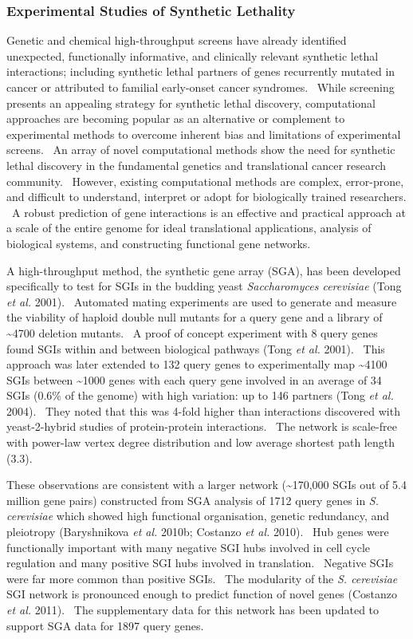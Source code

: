 \subsubsection[Experimental Studies of Synthetic Lethality]{Experimental Studies of Synthetic Lethality}
Genetic and chemical high-throughput screens have already identified unexpected, functionally informative, and clinically relevant synthetic lethal interactions; including synthetic lethal partners of genes recurrently mutated in cancer or attributed to familial early-onset cancer syndromes. \ While screening presents an appealing strategy for synthetic lethal discovery, computational approaches are becoming popular as an alternative or complement to experimental methods to overcome inherent bias and limitations of experimental screens. \ An array of novel computational methods show the need for synthetic lethal discovery in the fundamental genetics and translational cancer research community. \ However, existing computational methods are complex, error-prone, and difficult to understand, interpret or adopt for biologically trained researchers. \ A robust prediction of gene interactions is an effective and practical approach at a scale of the entire genome for ideal translational applications, analysis of biological systems, and constructing functional gene networks.

A high-throughput method, the synthetic gene array (SGA), has been developed specifically to test for SGIs in the budding yeast \textit{Saccharomyces cerevisiae} (Tong\textit{ et al.} 2001). \ Automated mating experiments are used to generate and measure the viability of haploid double null mutants for a query gene and a library of \~{}4700 deletion mutants. \ A proof of concept experiment with 8 query genes found SGIs within and between biological pathways (Tong\textit{ et al.} 2001). \ This approach was later extended to 132 query genes to experimentally map \~{}4100 SGIs between \~{}1000 genes with each query gene involved in an average of 34 SGIs (0.6\% of the genome) with high variation: up to 146 partners (Tong\textit{ et al.} 2004). \ They noted that this was 4-fold higher than interactions discovered with yeast-2-hybrid studies of protein-protein interactions. \ The network is scale-free with power-law vertex degree distribution and low average shortest path length (3.3). \  

These observations are consistent with a larger network (\~{}170,000 SGIs out of 5.4 million gene pairs) constructed from SGA analysis of 1712 query genes in \textit{S. cerevisiae} which showed high functional organisation, genetic redundancy, and pleiotropy (Baryshnikova\textit{ et al.} 2010b; Costanzo\textit{ et al.} 2010). \ Hub genes were functionally important with many negative SGI hubs involved in cell cycle regulation and many positive SGI hubs involved in translation. \ Negative SGIs were far more common than positive SGIs. \ The modularity of the \textit{S. cerevisiae} SGI network is pronounced enough to predict function of novel genes (Costanzo\textit{ et al.} 2011). \ The supplementary data for this network has been updated to support SGA data for 1897 query genes. \  

